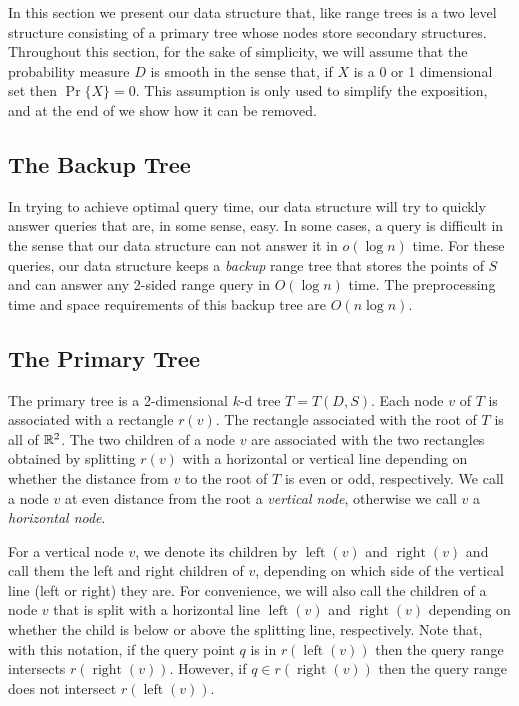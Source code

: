 \documentclass[lotsofwhite,charterfonts]{patmorin}
\DeclareMathOperator{\lft}{left}
\DeclareMathOperator{\rght}{right}
\begin{document}
In this section we present our data structure that, like range trees
is a two level structure consisting of a primary tree whose nodes
store secondary structures.  Throughout this section, for the sake of
simplicity, we will assume that the probability measure $D$ is smooth
in the sense that, if $X$ is a 0 or 1 dimensional set then
$\Pr\{X\}=0$.  This assumption is only used to simplify the
exposition, and at the end of  we show how it can be
removed.


\subsection{The Backup Tree}

In trying to achieve optimal query time, our data structure  will try
to quickly answer queries that are, in some sense, easy.  In some
cases, a query is difficult in the sense that our data structure can
not answer it in $o(\log n)$ time.  For these queries, our data
structure keeps a \emph{backup} range tree that stores the points of
$S$ and can answer any 2-sided range query in $O(\log n)$ time.
The preprocessing time and space requirements of this backup tree are
$O(n\log n)$.

\subsection{The Primary Tree}

The primary tree is a 2-dimensional $k$-d tree \cite{X} $T=T(D,S)$.
Each node $v$ of $T$ is associated with a rectangle $r(v)$.  The
rectangle associated with the root of $T$ is all of $\mathbb{R}^2$. The two
children of a node $v$ are associated with the two rectangles obtained
by splitting $r(v)$ with a horizontal or vertical line depending on
whether the distance from $v$ to the root of $T$ is even or odd,
respectively.  We call a node $v$ at even distance from the root a
\emph{vertical node}, otherwise we call $v$ a \emph{horizontal node}.

For a vertical node $v$, we denote its children by $\lft(v)$ and
$\rght(v)$ and call them the left and right children of $v$, depending
on which side of the vertical line (left or right) they are.  For
convenience, we will also call the children of a node $v$ that is
split with a horizontal line $\lft(v)$ and $\rght(v)$ depending on
whether the child is below or above the splitting line, respectively.
Note that, with this notation, if the query point $q$ is in
$r(\lft(v))$ then the query range intersects $r(\rght(v))$.  However,
if $q\in r(\rght(v))$ then the query range does not intersect
$r(\lft(v))$.
\end{document}
